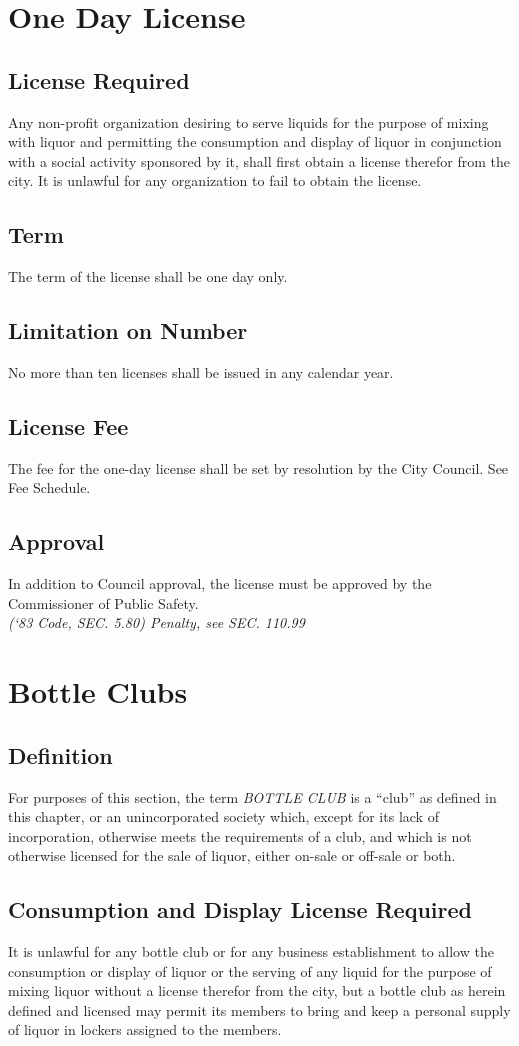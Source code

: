 \setcounter{section}{114}
\section{One Day License}
\subsection{License Required}
Any non-profit organization desiring to serve liquids for the purpose of mixing with liquor and permitting the consumption and display of liquor in conjunction with a social activity sponsored by it, shall first obtain a license therefor from the city. It is unlawful for any organization to fail to obtain the license.
\subsection{Term}
The term of the license shall be one day only.
\subsection{Limitation on Number}
No more than ten licenses shall be issued in any calendar year.
\subsection{License Fee}
The fee for the one-day license shall be set by resolution by the City Council. See Fee Schedule.
\subsection{Approval}
In addition to Council approval, the license must be approved by the Commissioner of Public Safety.\\
\emph{(‘83 Code, SEC. 5.80)  Penalty, see SEC. 110.99}
\section{Bottle Clubs}
\subsection{Definition}
For purposes of this section, the term \emph{BOTTLE CLUB} is a “club” as defined in this chapter, or an unincorporated society which, except for its lack of incorporation, otherwise meets the requirements of a club, and which is not otherwise licensed for the sale of liquor, either on-sale or off-sale or both.
\subsection{Consumption and Display License Required}
It is unlawful for any bottle club or for any business establishment to allow the consumption or display of liquor or the serving of any liquid for the purpose of mixing liquor without a license therefor from the city, but a bottle club as herein defined and licensed may permit its members to bring and keep a personal supply of liquor in lockers assigned to the members.
